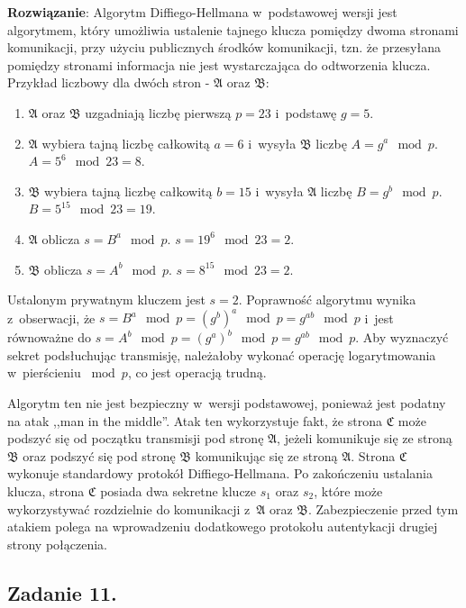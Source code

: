 \documentclass[a4paper,10pt, twocolumn]{article}
\begin{document}
\textbf{Rozwiązanie}: Algorytm Diffiego-Hellmana w~podstawowej wersji jest algorytmem, który umożliwia ustalenie tajnego klucza pomiędzy dwoma stronami komunikacji, przy użyciu publicznych środków komunikacji, tzn. że przesyłana pomiędzy stronami informacja nie jest wystarczająca do odtworzenia klucza. Przykład liczbowy dla dwóch stron - $\mathfrak{A}$ oraz $\mathfrak{B}$:

\begin{enumerate}
 \item $\mathfrak{A}$ oraz $\mathfrak{B}$ uzgadniają liczbę pierwszą $p=23$ i~podstawę $g=5$.
 \item $\mathfrak{A}$ wybiera tajną liczbę całkowitą $a=6$ i~wysyła $\mathfrak{B}$ liczbę $A = g^{a} \mod p$. $A = 5^{6} \mod 23 = 8$.
 \item $\mathfrak{B}$ wybiera tajną liczbę całkowitą $b=15$ i~wysyła $\mathfrak{A}$ liczbę $B = g^{b} \mod p$. $B = 5^{15} \mod 23 = 19$.
 \item $\mathfrak{A}$ oblicza $s = B^{a} \mod p$. $s = 19^{6} \mod 23 = 2$.
 \item $\mathfrak{B}$ oblicza $s = A^{b} \mod p$. $s = 8^{15} \mod 23 = 2$.
\end{enumerate}

\noindent Ustalonym prywatnym kluczem jest $s = 2$. Poprawność algorytmu wynika z~obserwacji, że $s = B^{a} \mod p = (g^{b})^{a} \mod p = g^{ab} \mod p$ i~jest równoważne do $s = A^{b} \mod p = (g^{a})^{b} \mod p = g^{ab} \mod p$. Aby wyznaczyć sekret podsłuchując transmisję, należałoby wykonać operację logarytmowania w~pierścieniu $\bmod{p}$, co jest operacją trudną.

\noindent Algorytm ten nie jest bezpieczny w~wersji podstawowej, ponieważ jest podatny na atak ,,man in the middle''. Atak ten wykorzystuje fakt, że strona $\mathfrak{C}$ może podszyć się od początku transmisji pod stronę $\mathfrak{A}$, jeżeli komunikuje się ze stroną $\mathfrak{B}$ oraz podszyć się pod stronę $\mathfrak{B}$ komunikując się ze stroną $\mathfrak{A}$. Strona $\mathfrak{C}$ wykonuje standardowy protokół Diffiego-Hellmana. Po zakończeniu ustalania klucza, strona $\mathfrak{C}$ posiada dwa sekretne klucze $s_{1}$ oraz $s_{2}$, które może wykorzystywać rozdzielnie do komunikacji z~$\mathfrak{A}$ oraz $\mathfrak{B}$. Zabezpieczenie przed tym atakiem polega na wprowadzeniu dodatkowego protokołu autentykacji drugiej strony połączenia.  

\subsection{Zadanie 11.}
\end{document}
